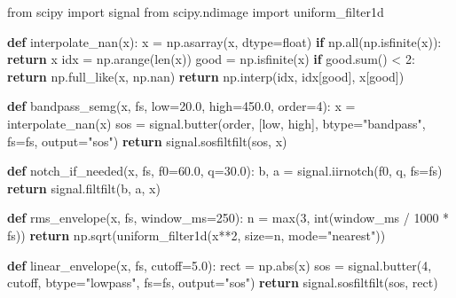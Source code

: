 \documentclass[
  spanish,
  a4paper,
  DIV=11,
  numbers=noendperiod]{scrreprt}
\newenvironment{Shaded}{\begin{snugshade}}{\end{snugshade}}
\newcommand{\BuiltInTok}[1]{\textcolor[rgb]{0.00,0.23,0.31}{#1}}
\newcommand{\ControlFlowTok}[1]{\textcolor[rgb]{0.00,0.23,0.31}{\textbf{#1}}}
\newcommand{\DecValTok}[1]{\textcolor[rgb]{0.68,0.00,0.00}{#1}}
\newcommand{\FloatTok}[1]{\textcolor[rgb]{0.68,0.00,0.00}{#1}}
\newcommand{\ImportTok}[1]{\textcolor[rgb]{0.00,0.46,0.62}{#1}}
\newcommand{\KeywordTok}[1]{\textcolor[rgb]{0.00,0.23,0.31}{\textbf{#1}}}
\newcommand{\NormalTok}[1]{\textcolor[rgb]{0.00,0.23,0.31}{#1}}
\newcommand{\OperatorTok}[1]{\textcolor[rgb]{0.37,0.37,0.37}{#1}}
\newcommand{\StringTok}[1]{\textcolor[rgb]{0.13,0.47,0.30}{#1}}
\begin{document}
\begin{Shaded}
\begin{Highlighting}[]
\ImportTok{from}\NormalTok{ scipy }\ImportTok{import}\NormalTok{ signal}
\ImportTok{from}\NormalTok{ scipy.ndimage }\ImportTok{import}\NormalTok{ uniform\_filter1d}


\KeywordTok{def}\NormalTok{ interpolate\_nan(x):}
\NormalTok{    x }\OperatorTok{=}\NormalTok{ np.asarray(x, dtype}\OperatorTok{=}\BuiltInTok{float}\NormalTok{)}
    \ControlFlowTok{if}\NormalTok{ np.}\BuiltInTok{all}\NormalTok{(np.isfinite(x)):}
        \ControlFlowTok{return}\NormalTok{ x}
\NormalTok{    idx }\OperatorTok{=}\NormalTok{ np.arange(}\BuiltInTok{len}\NormalTok{(x))}
\NormalTok{    good }\OperatorTok{=}\NormalTok{ np.isfinite(x)}
    \ControlFlowTok{if}\NormalTok{ good.}\BuiltInTok{sum}\NormalTok{() }\OperatorTok{\textless{}} \DecValTok{2}\NormalTok{:}
        \ControlFlowTok{return}\NormalTok{ np.full\_like(x, np.nan)}
    \ControlFlowTok{return}\NormalTok{ np.interp(idx, idx[good], x[good])}


\KeywordTok{def}\NormalTok{ bandpass\_semg(x, fs, low}\OperatorTok{=}\FloatTok{20.0}\NormalTok{, high}\OperatorTok{=}\FloatTok{450.0}\NormalTok{, order}\OperatorTok{=}\DecValTok{4}\NormalTok{):}
\NormalTok{    x }\OperatorTok{=}\NormalTok{ interpolate\_nan(x)}
\NormalTok{    sos }\OperatorTok{=}\NormalTok{ signal.butter(order, [low, high], btype}\OperatorTok{=}\StringTok{"bandpass"}\NormalTok{, fs}\OperatorTok{=}\NormalTok{fs, output}\OperatorTok{=}\StringTok{"sos"}\NormalTok{)}
    \ControlFlowTok{return}\NormalTok{ signal.sosfiltfilt(sos, x)}


\KeywordTok{def}\NormalTok{ notch\_if\_needed(x, fs, f0}\OperatorTok{=}\FloatTok{60.0}\NormalTok{, q}\OperatorTok{=}\FloatTok{30.0}\NormalTok{):}
\NormalTok{    b, a }\OperatorTok{=}\NormalTok{ signal.iirnotch(f0, q, fs}\OperatorTok{=}\NormalTok{fs)}
    \ControlFlowTok{return}\NormalTok{ signal.filtfilt(b, a, x)}


\KeywordTok{def}\NormalTok{ rms\_envelope(x, fs, window\_ms}\OperatorTok{=}\DecValTok{250}\NormalTok{):}
\NormalTok{    n }\OperatorTok{=} \BuiltInTok{max}\NormalTok{(}\DecValTok{3}\NormalTok{, }\BuiltInTok{int}\NormalTok{(window\_ms }\OperatorTok{/} \DecValTok{1000} \OperatorTok{*}\NormalTok{ fs))}
    \ControlFlowTok{return}\NormalTok{ np.sqrt(uniform\_filter1d(x}\OperatorTok{**}\DecValTok{2}\NormalTok{, size}\OperatorTok{=}\NormalTok{n, mode}\OperatorTok{=}\StringTok{"nearest"}\NormalTok{))}


\KeywordTok{def}\NormalTok{ linear\_envelope(x, fs, cutoff}\OperatorTok{=}\FloatTok{5.0}\NormalTok{):}
\NormalTok{    rect }\OperatorTok{=}\NormalTok{ np.}\BuiltInTok{abs}\NormalTok{(x)}
\NormalTok{    sos }\OperatorTok{=}\NormalTok{ signal.butter(}\DecValTok{4}\NormalTok{, cutoff, btype}\OperatorTok{=}\StringTok{"lowpass"}\NormalTok{, fs}\OperatorTok{=}\NormalTok{fs, output}\OperatorTok{=}\StringTok{"sos"}\NormalTok{)}
    \ControlFlowTok{return}\NormalTok{ signal.sosfiltfilt(sos, rect)}
\end{Highlighting}
\end{Shaded}
\end{document}

